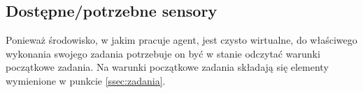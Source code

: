 \subsection{Dostępne/potrzebne sensory}
Ponieważ środowisko, w jakim pracuje agent, jest czysto wirtualne, do właściwego wykonania swojego zadania potrzebuje on być w stanie odczytać warunki początkowe zadania. Na warunki początkowe zadania składają się elementy wymienione w punkcie \ref{ssec:zadania}.


